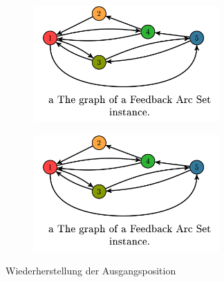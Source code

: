 \documentclass[seminar,german]{algothesis}
\begin{document}
\begin{figure}[ht]
	\centering
	\begin{subfigure}{.4\textwidth}
		\includegraphics[width=0.78\textwidth]{graph}
    \end{subfigure}%
    \begin{subfigure}{.4\textwidth}
		\includegraphics[width=0.78\textwidth]{graph}
    \end{subfigure}
    \caption{Wiederherstellung der Ausgangsposition}
	\label{fig:kmpkt2}
\end{figure}
\newpage
\end{document}
